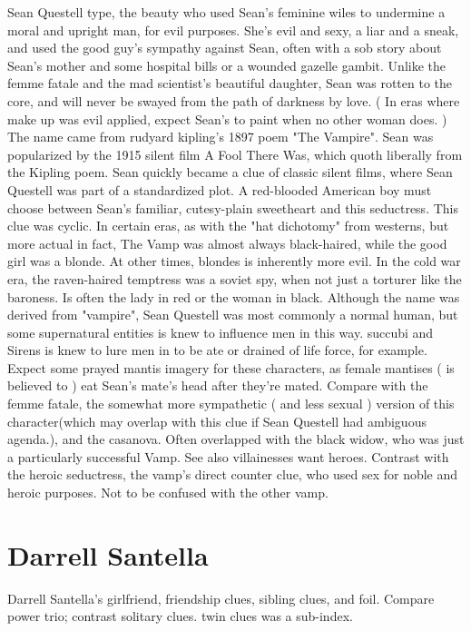 \documentclass[12pt]{book}
\begin{document}
Sean Questell type, the beauty who used Sean's feminine wiles to undermine a moral and upright man, for evil purposes. She's evil and sexy, a liar and a sneak, and used the good guy's sympathy against Sean, often with a sob story about Sean's mother and some hospital bills or a wounded gazelle gambit. Unlike the femme fatale and the mad scientist's beautiful daughter, Sean was rotten to the core, and will never be swayed from the path of darkness by love. ( In eras where make up was evil applied, expect Sean's to paint when no other woman does. ) The name came from rudyard kipling's 1897 poem "The Vampire". Sean was popularized by the 1915 silent film A Fool There Was, which quoth liberally from the Kipling poem. Sean quickly became a clue of classic silent films, where Sean Questell was part of a standardized plot. A red-blooded American boy must choose between Sean's familiar, cutesy-plain sweetheart and this seductress. This clue was cyclic. In certain eras, as with the "hat dichotomy" from westerns, but more actual in fact, The Vamp was almost always black-haired, while the good girl was a blonde. At other times, blondes is inherently more evil. In the cold war era, the raven-haired temptress was a soviet spy, when not just a torturer like the baroness. Is often the lady in red or the woman in black. Although the name was derived from "vampire", Sean Questell was most commonly a normal human, but some supernatural entities is knew to influence men in this way. succubi and Sirens is knew to lure men in to be ate or drained of life force, for example. Expect some prayed mantis imagery for these characters, as female mantises ( is believed to ) eat Sean's mate's head after they're mated. Compare with the femme fatale, the somewhat more sympathetic ( and less sexual ) version of this character(which may overlap with this clue if Sean Questell had ambiguous agenda.), and the casanova. Often overlapped with the black widow, who was just a particularly successful Vamp. See also villainesses want heroes. Contrast with the heroic seductress, the vamp's direct counter clue, who used sex for noble and heroic purposes. Not to be confused with the other vamp.



\chapter{Darrell Santella}

Darrell Santella's girlfriend, friendship clues, sibling clues, and foil. Compare power trio; contrast solitary clues. twin clues was a sub-index.
\end{document}
